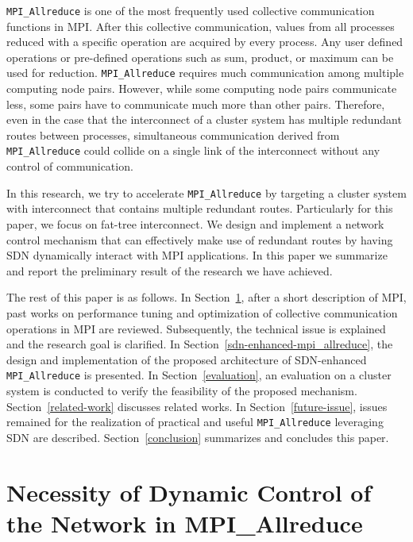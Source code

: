\texttt{MPI\_Allreduce} is one of the most frequently used collective
communication functions in MPI\@. After this collective communication,
values from all processes reduced with a specific operation are acquired
by every process. Any user defined operations or pre-defined operations
such as sum, product, or maximum can be used for reduction.
\texttt{MPI\_Allreduce} requires much communication among multiple
computing node pairs. However, while some computing node pairs
communicate less, some pairs have to communicate much more than other
pairs. Therefore, even in the case that the interconnect of a cluster
system has multiple redundant routes between processes, simultaneous
communication derived from \texttt{MPI\_Allreduce} could collide on a
single link of the interconnect without any control of communication.

In this research, we try to accelerate \texttt{MPI\_Allreduce} by
targeting a cluster system with interconnect that contains multiple
redundant routes. Particularly for this paper, we focus on fat-tree
interconnect. We design and implement a network control mechanism that
can effectively make use of redundant routes by having SDN dynamically
interact with MPI applications. In this paper we summarize and report
the preliminary result of the research we have achieved.

The rest of this paper is as follows. In
Section~\ref{necessity-of-dynamic-control-of-the-network-in-mpi_allreduce},
after a short description of MPI, past works on performance tuning and
optimization of collective communication operations in MPI are reviewed.
Subsequently, the technical issue is explained and the research goal is
clarified. In Section~\ref{sdn-enhanced-mpi_allreduce}, the design and
implementation of the proposed architecture of SDN-enhanced
\texttt{MPI\_Allreduce} is presented. In Section~\ref{evaluation}, an
evaluation on a cluster system is conducted to verify the feasibility of the
proposed mechanism. Section~\ref{related-work} discusses related works. In
Section~\ref{future-issue}, issues remained for the realization of practical
and useful \texttt{MPI\_Allreduce} leveraging SDN are described.
Section~\ref{conclusion} summarizes and concludes this paper.

\hypertarget{necessity-of-dynamic-control-of-the-network-in-mpi_allreduce}{%
\section{Necessity of Dynamic Control of the Network in
MPI\_Allreduce}\label{necessity-of-dynamic-control-of-the-network-in-mpi_allreduce}}

